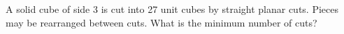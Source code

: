 A solid cube of side 3 is cut into 27 unit cubes by straight planar cuts. Pieces may be rearranged between cuts. What is the minimum number of cuts?
